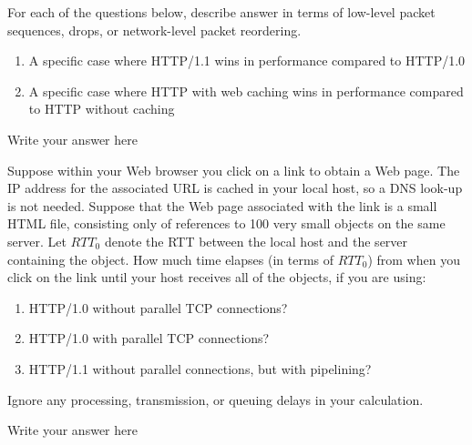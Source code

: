 \documentclass{report}
\begin{document}
\newpage



\begin{problem}
For each of the questions below, describe answer in terms of low-level packet sequences, drops, or network-level packet reordering.

\begin{enumerate}
  
\item A specific case where HTTP/1.1 wins in performance compared to HTTP/1.0

\item A specific case where HTTP with web caching wins in performance compared to HTTP without caching

\end{enumerate}

\begin{answer}{30em}
    Write your answer here
\end{answer}

\end{problem}

\newpage




\begin{problem}
Suppose within your Web browser you click on a link to obtain a Web page. The IP address for the associated  URL is cached in your local host, so a DNS look-up is not needed. Suppose that the Web page associated with the link is a small HTML file, consisting only of references to 100 very small objects on the same server. Let $RTT_0$ denote the RTT between the local host and the server containing the object. How much time elapses (in terms of $RTT_0$) from when you click on the link until your host receives all of the objects, if you are using:
\begin{enumerate}
		\item HTTP/1.0 without parallel TCP connections?
		\item HTTP/1.0 with parallel TCP connections?
		\item HTTP/1.1 without parallel connections, but with pipelining?
\end{enumerate}

Ignore any processing, transmission, or queuing delays in your calculation.\\

  \begin{answer}{37em}
  Write your answer here
  \end{answer}

\end{problem}
\end{document}
